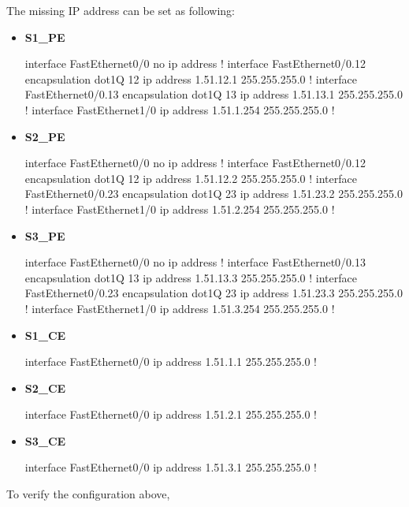 \documentclass[10pt]{article}
\begin{document}
The missing IP address can be set as following:
\begin{itemize}
	\item {\bf S1\_PE}
	\begin{verbatim*}
		interface FastEthernet0/0
		 no ip address
		!
		interface FastEthernet0/0.12
		 encapsulation dot1Q 12
		 ip address 1.51.12.1 255.255.255.0
		!
		interface FastEthernet0/0.13
		 encapsulation dot1Q 13
		 ip address 1.51.13.1 255.255.255.0
		!
		interface FastEthernet1/0
		 ip address 1.51.1.254 255.255.255.0
		!
	\end{verbatim*}
	\item {\bf S2\_PE}
	\begin{verbatim*}
		interface FastEthernet0/0
		 no ip address
		!
		interface FastEthernet0/0.12
		 encapsulation dot1Q 12
		 ip address 1.51.12.2 255.255.255.0
		!
		interface FastEthernet0/0.23
		 encapsulation dot1Q 23
		 ip address 1.51.23.2 255.255.255.0
		!
		interface FastEthernet1/0
		 ip address 1.51.2.254 255.255.255.0
		!
	\end{verbatim*}
	\item {\bf S3\_PE}
	\begin{verbatim*}
		interface FastEthernet0/0
		 no ip address
		!
		interface FastEthernet0/0.13
		 encapsulation dot1Q 13
		 ip address 1.51.13.3 255.255.255.0
		!
		interface FastEthernet0/0.23
		 encapsulation dot1Q 23
		 ip address 1.51.23.3 255.255.255.0
		!
		interface FastEthernet1/0
		 ip address 1.51.3.254 255.255.255.0
		!
	\end{verbatim*}
	\item {\bf S1\_CE}
	\begin{verbatim*}
		interface FastEthernet0/0
		 ip address 1.51.1.1 255.255.255.0
		!
	\end{verbatim*}
	\item {\bf S2\_CE}
	\begin{verbatim*}
		interface FastEthernet0/0
		 ip address 1.51.2.1 255.255.255.0
		!
	\end{verbatim*}
	\item {\bf S3\_CE}
	\begin{verbatim*}
		interface FastEthernet0/0
		 ip address 1.51.3.1 255.255.255.0
		!
	\end{verbatim*}
\end{itemize}
To verify the configuration above,
\end{document}

